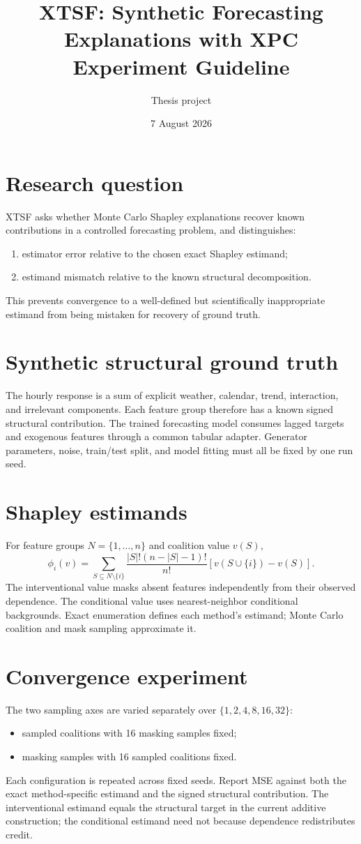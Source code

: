 \documentclass[10pt,a4paper]{article}
\title{\textbf{XTSF: Synthetic Forecasting Explanations with XPC}\\Experiment Guideline}
\author{Thesis project}
\date{7 August 2026}
\begin{document}
\maketitle

\section{Research question}
XTSF asks whether Monte Carlo Shapley explanations recover known contributions
in a controlled forecasting problem, and distinguishes:
\begin{enumerate}
\item estimator error relative to the chosen exact Shapley estimand;
\item estimand mismatch relative to the known structural decomposition.
\end{enumerate}
This prevents convergence to a well-defined but scientifically inappropriate
estimand from being mistaken for recovery of ground truth.

\section{Synthetic structural ground truth}
The hourly response is a sum of explicit weather, calendar, trend, interaction,
and irrelevant components. Each feature group therefore has a known signed
structural contribution. The trained forecasting model consumes lagged targets
and exogenous features through a common tabular adapter. Generator parameters,
noise, train/test split, and model fitting must all be fixed by one run seed.

\section{Shapley estimands}
For feature groups $N=\{1,\ldots,n\}$ and coalition value $v(S)$,
\[
\phi_i(v)=\sum_{S\subseteq N\setminus\{i\}}
\frac{|S|!(n-|S|-1)!}{n!}\left[v(S\cup\{i\})-v(S)\right].
\]
The interventional value masks absent features independently from their
observed dependence. The conditional value uses nearest-neighbor conditional
backgrounds. Exact enumeration defines each method's estimand; Monte Carlo
coalition and mask sampling approximate it.

\section{Convergence experiment}
The two sampling axes are varied separately over
$\{1,2,4,8,16,32\}$:
\begin{itemize}
\item sampled coalitions with 16 masking samples fixed;
\item masking samples with 16 sampled coalitions fixed.
\end{itemize}
Each configuration is repeated across fixed seeds. Report MSE against both the
exact method-specific estimand and the signed structural contribution. The
interventional estimand equals the structural target in the current additive
construction; the conditional estimand need not because dependence redistributes
credit.
\end{document}
